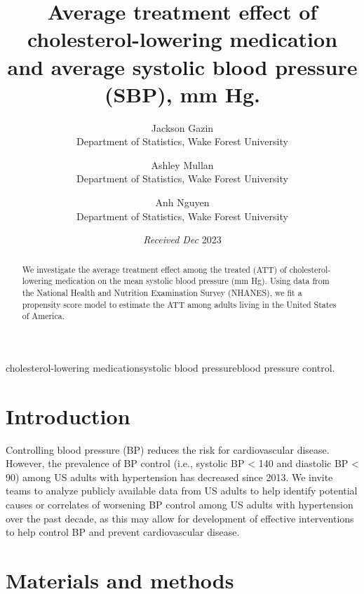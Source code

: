 \documentclass[useAMS,usenatbib,referee]{biom}
\title[]{Average treatment effect of cholesterol-lowering medication and
average systolic blood pressure (SBP), mm Hg.}
\author{ Jackson
Gazin \email{\href{mailto:gazij22@wfu.edu}{\nolinkurl{gazij22@wfu.edu}}} \\ Department
of Statistics, Wake Forest University  \and
		 Ashley
Mullan \email{\href{mailto:mullae22@wfu.edu}{\nolinkurl{mullae22@wfu.edu}}} \\ Department
of Statistics, Wake Forest University  \and
		 Anh
Nguyen \email{\href{mailto:nguyp22@wfu.edu}{\nolinkurl{nguyp22@wfu.edu}}} \\ Department
of Statistics, Wake Forest University 
	   }
\begin{document}
\date{{\it Received Dec} 2023}

\pagerange{\pageref{firstpage}--\pageref{lastpage}} 



\label{firstpage}


\begin{abstract}
We investigate the average treatment effect among the treated (ATT) of
cholesterol-lowering medication on the mean systolic blood pressure (mm
Hg). Using data from the National Health and Nutrition Examination
Survey (NHANES), we fit a propensity score model to estimate the ATT
among adults living in the United States of America.
\end{abstract}

%
%

\begin{keywords}
cholesterol-lowering medicationsystolic blood pressureblood pressure
control.
\end{keywords}

\maketitle

\hypertarget{intro}{%
\section{Introduction}\label{intro}}

Controlling blood pressure (BP) reduces the risk for cardiovascular
disease. However, the prevalence of BP control (i.e., systolic BP
\textless{} 140 and diastolic BP \textless{} 90) among US adults with
hypertension has decreased since 2013. We invite teams to analyze
publicly available data from US adults to help identify potential causes
or correlates of worsening BP control among US adults with hypertension
over the past decade, as this may allow for development of effective
interventions to help control BP and prevent cardiovascular disease.

\hypertarget{methods}{%
\section{Materials and methods}\label{methods}}
\end{document}

